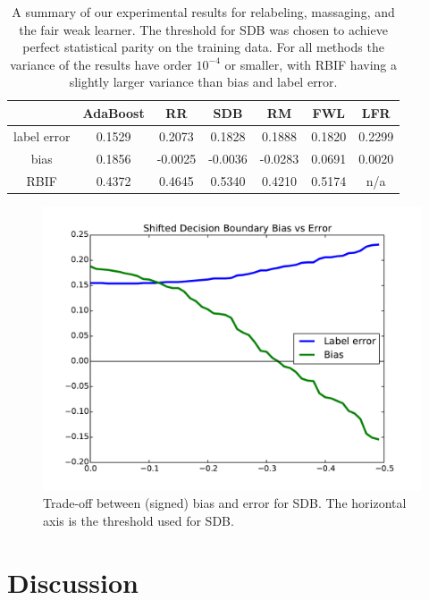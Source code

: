 \documentclass{article}
\begin{document}
\begin{table}
\centering
\begin{tabular}{| c | cccccc |}
\hline
               & AdaBoost & RR    & SDB  & RM   & FWL  & LFR \cite{ZemelWSPD13} \\
\hline 
label error    & 0.1529 & 0.2073 & 0.1828 & 0.1888 & 0.1820 & 0.2299 \\ 
bias           & 0.1856 &-0.0025 &-0.0036 &-0.0283 & 0.0691 & 0.0020 \\ 
RBIF           & 0.4372 & 0.4645 & 0.5340 & 0.4210 & 0.5174 & n/a \\ 
\hline 
\hline 
\end{tabular}
\caption{A summary of our experimental results for relabeling, massaging, and
the fair weak learner. The threshold for SDB was chosen to achieve perfect
statistical parity on the training data. For all methods the variance of the
results have order $10^{-4}$ or smaller, with RBIF having a slightly larger
variance than bias and label error.}
\label{table:results}
\end{table}

\begin{figure}[t]
\centering
\includegraphics[width=\columnwidth]{images/relabeling-msr-tradeoffs.pdf}
\caption{Trade-off between (signed) bias and error for SDB. The
horizontal axis is the threshold used for SDB.}
\label{fig:tradeoffs}
\end{figure}

\section{Discussion}\label{sec:discussion}
\end{document}
